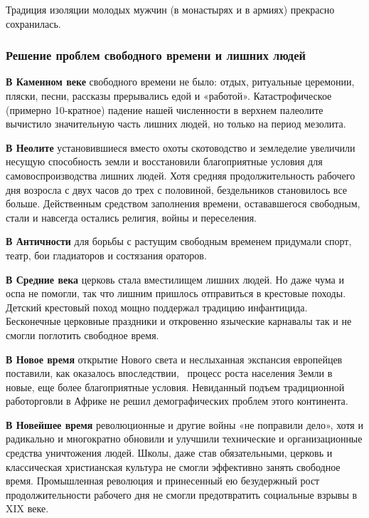 Традиция изоляции молодых мужчин (в монастырях и в армиях) прекрасно сохранилась.

\subsubsection[Решение проблем свободного времени и лишних людей]{Решение проблем свободного времени и лишних
людей}

\textbf{В Каменном веке} свободного времени не было: отдых, ритуальные церемонии, пляски, песни, рассказы прерывались
едой и «работой». Катастрофическое (примерно 10-кратное) падение нашей численности в верхнем палеолите вычистило
значительную часть лишних людей, но только на период мезолита.


\textbf{В Неолите} установившиеся вместо охоты скотоводство и земледелие увеличили несущую способность земли и
восстановили благоприятные условия для самовоспроизводства лишних людей. Хотя средняя продолжительность рабочего дня
возросла с двух часов до трех с половиной, бездельников становилось все больше. Действенным средством заполнения
времени, остававшегося свободным, стали и навсегда остались религия, войны и переселения.


\textbf{В Античности} для борьбы с растущим свободным временем придумали спорт, театр, бои гладиаторов и состязания
ораторов.


\textbf{В Средние века} церковь стала вместилищем лишних людей. Но даже чума и оспа не помогли, так что лишним пришлось
отправиться в крестовые походы. Детский крестовый поход мощно поддержал традицию инфантицида. Бесконечные церковные
праздники и откровенно языческие карнавалы так и не смогли поглотить свободное время.


\textbf{В Новое время} открытие Нового света и неслыханная экспансия европейцев поставили, как оказалось впоследствии,
\ процесс роста населения Земли в новые, еще более благоприятные условия. Невиданный подъем традиционной работорговли в
Африке не решил демографических проблем этого континента.


\textbf{В Новейшее время} революционные и другие войны «не поправили дело», хотя и радикально и многократно обновили и
улучшили технические и организационные средства уничтожения людей. Школы, даже став обязательными, церковь и
классическая христианская культура не смогли эффективно занять свободное время. Промышленная революция и принесенный ею
безудержный рост продолжительности рабочего дня не смогли предотвратить социальные взрывы в
\foreignlanguage{english}{XIX} веке.


